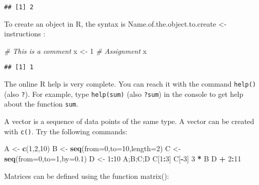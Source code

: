 \documentclass[
]{book}
\newenvironment{Shaded}{\begin{snugshade}}{\end{snugshade}}
\newcommand{\AttributeTok}[1]{\textcolor[rgb]{0.13,0.29,0.53}{#1}}
\newcommand{\CommentTok}[1]{\textcolor[rgb]{0.56,0.35,0.01}{\textit{#1}}}
\newcommand{\DecValTok}[1]{\textcolor[rgb]{0.00,0.00,0.81}{#1}}
\newcommand{\FloatTok}[1]{\textcolor[rgb]{0.00,0.00,0.81}{#1}}
\newcommand{\FunctionTok}[1]{\textcolor[rgb]{0.13,0.29,0.53}{\textbf{#1}}}
\newcommand{\NormalTok}[1]{#1}
\newcommand{\OtherTok}[1]{\textcolor[rgb]{0.56,0.35,0.01}{#1}}
\newcommand{\SpecialCharTok}[1]{\textcolor[rgb]{0.81,0.36,0.00}{\textbf{#1}}}
\begin{document}
\begin{verbatim}
## [1] 2
\end{verbatim}

To create an object in R, the syntax is Name.of.the.object.to.create \textless- instructions :

\begin{Shaded}
\begin{Highlighting}[]
\CommentTok{\# This is a comment}
\NormalTok{x }\OtherTok{\textless{}{-}} \DecValTok{1} \CommentTok{\# Assignment}
\NormalTok{x}
\end{Highlighting}
\end{Shaded}

\begin{verbatim}
## [1] 1
\end{verbatim}

The online R help is very complete. You can reach it with the command \texttt{help()} (also \texttt{?}). For example, type \texttt{help(sum)} (also \texttt{?sum}) in the console to get help about the function \texttt{sum}.

A vector is a sequence of data points of the same type. A vector can be created with \texttt{c()}. Try the following commands:

\begin{Shaded}
\begin{Highlighting}[]
\NormalTok{A }\OtherTok{\textless{}{-}} \FunctionTok{c}\NormalTok{(}\DecValTok{1}\NormalTok{,}\DecValTok{2}\NormalTok{,}\DecValTok{10}\NormalTok{)}
\NormalTok{B }\OtherTok{\textless{}{-}} \FunctionTok{seq}\NormalTok{(}\AttributeTok{from=}\DecValTok{0}\NormalTok{,}\AttributeTok{to=}\DecValTok{10}\NormalTok{,}\AttributeTok{length=}\DecValTok{2}\NormalTok{)}
\NormalTok{C }\OtherTok{\textless{}{-}} \FunctionTok{seq}\NormalTok{(}\AttributeTok{from=}\DecValTok{0}\NormalTok{,}\AttributeTok{to=}\DecValTok{1}\NormalTok{,}\AttributeTok{by=}\FloatTok{0.1}\NormalTok{)}
\NormalTok{D }\OtherTok{\textless{}{-}} \DecValTok{1}\SpecialCharTok{:}\DecValTok{10}
\NormalTok{A;B;C;D}
\NormalTok{C[}\DecValTok{1}\SpecialCharTok{:}\DecValTok{3}\NormalTok{]}
\NormalTok{C[}\SpecialCharTok{{-}}\DecValTok{3}\NormalTok{]}
\DecValTok{3} \SpecialCharTok{*}\NormalTok{ B}
\NormalTok{D }\SpecialCharTok{+} \DecValTok{2}\SpecialCharTok{:}\DecValTok{11}
\end{Highlighting}
\end{Shaded}

Matrices can be defined using the function matrix():
\end{document}
